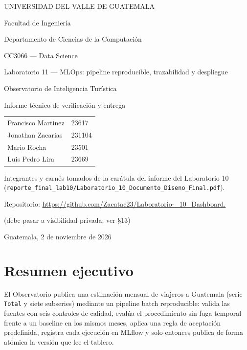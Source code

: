 \documentclass[11pt,a4paper]{article}
\newcommand{\cod}[1]{\texttt{\small #1}}
\begin{document}
\begin{titlepage}
\centering
{\large UNIVERSIDAD DEL VALLE DE GUATEMALA\par}
\vspace{0.3cm}
Facultad de Ingeniería\par
Departamento de Ciencias de la Computación\par
\vspace{1.6cm}
CC3066 --- Data Science\par
Laboratorio 11 --- MLOps: pipeline reproducible, trazabilidad y despliegue\par
\vspace{1.2cm}
{\LARGE Observatorio de Inteligencia Turística\par}
\vspace{0.3cm}
{\large Informe técnico de verificación y entrega\par}
\vspace{1.6cm}
\begin{tabular}{ll}
Francisco Martinez & 23617\\
Jonathan Zacarias & 231104\\
Mario Rocha & 23501\\
Luis Pedro Lira & 23669\\
\end{tabular}\par
\vspace{0.4cm}
{\small Integrantes y carnés tomados de la carátula del informe del Laboratorio 10\\(\cod{reporte\_final\_lab10/Laboratorio\_10\_Documento\_Diseno\_Final.pdf}).\par}
\vfill
Repositorio: \url{https://github.com/Zacatac23/Laboratorio-_10_Dashboard.}\\
{\small (debe pasar a visibilidad privada; ver §13)\par}
\vspace{0.6cm}
Guatemala, 2 de noviembre de 2026\par
\end{titlepage}

\section*{Resumen ejecutivo}
El Observatorio publica una estimación mensual de viajeros a Guatemala (serie \cod{Total} y siete subseries) mediante un pipeline batch reproducible: valida las fuentes con seis controles de calidad, evalúa el procedimiento sin fuga temporal frente a un baseline en los mismos meses, aplica una regla de aceptación predefinida, registra cada ejecución en MLflow y solo entonces publica de forma atómica la versión que lee el tablero.
\end{document}
